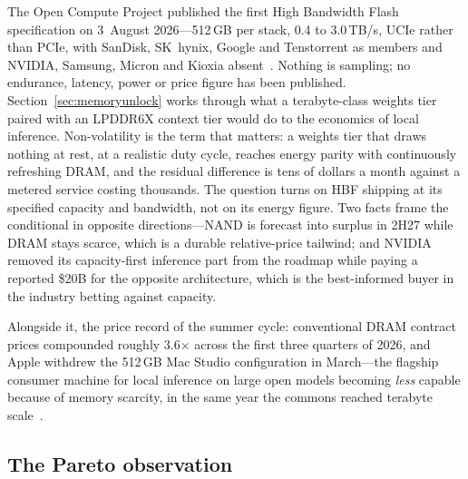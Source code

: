The Open Compute Project published the first High Bandwidth Flash specification on 3~August 2026---512\,GB per stack, 0.4 to 3.0\,TB/s, UCIe rather than PCIe, with SanDisk, SK~hynix, Google and Tenstorrent as members and NVIDIA, Samsung, Micron and Kioxia absent~\cite{hbf-ocp,hbf-spec}. Nothing is sampling; no endurance, latency, power or price figure has been published. Section~\ref{sec:memoryunlock} works through what a terabyte-class weights tier paired with an LPDDR6X context tier would do to the economics of local inference. Non-volatility is the term that matters: a weights tier that draws nothing at rest, at a realistic duty cycle, reaches energy parity with continuously refreshing DRAM, and the residual difference is tens of dollars a month against a metered service costing thousands. The question turns on HBF shipping at its specified capacity and bandwidth, not on its energy figure. Two facts frame the conditional in opposite directions---NAND is forecast into surplus in 2H27 while DRAM stays scarce, which is a durable relative-price tailwind; and NVIDIA removed its capacity-first inference part from the roadmap while paying a reported \$20B for the opposite architecture, which is the best-informed buyer in the industry betting against capacity.

Alongside it, the price record of the summer cycle: conventional DRAM contract prices compounded roughly 3.6$\times$ across the first three quarters of 2026, and Apple withdrew the 512\,GB Mac Studio configuration in March---the flagship consumer machine for local inference on large open models becoming \emph{less} capable because of memory scarcity, in the same year the commons reached terabyte scale~\cite{trendforce-dram,mac-studio-512}.

\subsection{The Pareto observation}

